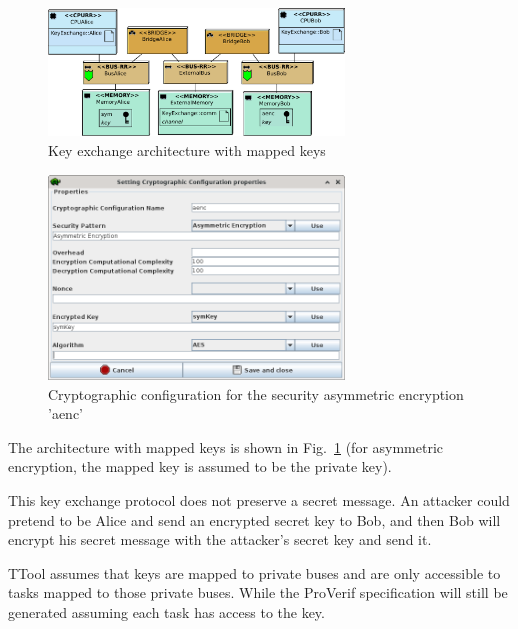 \documentclass{llncs}
\begin{document}
\begin{figure}[htbp]
	\centering	\includegraphics[width=0.7\textwidth]{figures/securityStuff/arch_alice_bob_keyExchange.pdf}
	\caption{Key exchange architecture with mapped keys}
	\label{fig:keyArch}
\end{figure}

\begin{figure}[htbp]
	\centering	\includegraphics[width=0.7\textwidth]{figures/securityStuff/encrypt-config-keyexchange-aenc.png}
	\caption{Cryptographic configuration for the security asymmetric encryption 'aenc'}
	\label{fig:keySecConfig-aenc}
\end{figure}
 
The architecture with mapped keys is shown in Fig.~\ref{fig:keyArch} (for
asymmetric encryption, the mapped key is assumed to be the private key).

This key exchange protocol does not preserve a secret
message. An attacker could pretend to be Alice and send an encrypted secret key to Bob, and then Bob will encrypt his
secret message with the attacker's secret key and send it.


TTool assumes that keys are mapped to private buses and are only accessible to tasks mapped to those private buses.%
While the ProVerif specification will still be generated assuming each task has access to the key.%
\end{document}
